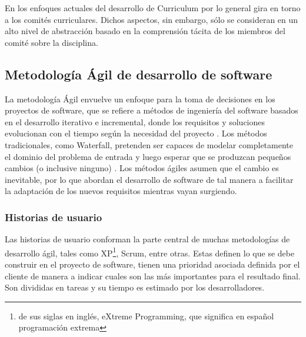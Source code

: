 En los enfoques actuales del desarrollo de Curriculum por lo general gira en torno a los comités curriculares. Dichos aspectos, sin embargo, sólo se consideran en un alto nivel de abstracción basado en la comprensión tácita de los miembros del comité sobre la disciplina.


\subsection{Metodología Ágil de desarrollo de software}
La metodología Ágil envuelve un enfoque para la toma de decisiones en los proyectos de software, que se refiere a métodos de ingeniería del software basados en el desarrollo iterativo e incremental, donde los requisitos y soluciones evolucionan con el tiempo según la necesidad del proyecto \citep{davis_agile_2015}. Los métodos tradicionales, como Waterfall, pretenden ser capaces de modelar completamente el dominio del problema de entrada y luego esperar que se produzcan pequeños cambios (o inclusive ninguno) \citep{davis_agile_2015}. Los métodos ágiles asumen que el cambio es inevitable, por lo que abordan el desarrollo de software de tal manera a facilitar la adaptación de los nuevos requisitos mientras vayan surgiendo.



\subsubsection{Historias de usuario}
Las historias de usuario conforman la parte central de muchas metodologías de desarrollo ágil, tales como XP\footnote{de sus siglas en inglés, eXtreme Programming, que significa en español programación extrema}, Scrum, entre otras. Estas definen lo que se debe construir en el proyecto de software, tienen una prioridad asociada definida por el cliente de manera a indicar cuales son las más importantes para el resultado final. Son divididas en tareas y su tiempo es estimado por los desarrolladores.

